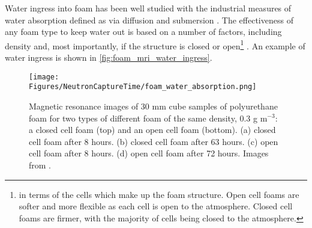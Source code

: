 

\par
Water ingress into foam has been well studied  with the industrial measures of water absorption defined as via diffusion and submersion \cite{foam_with_water_ref}.
The effectiveness of any foam type to keep water out is based on a number of factors, including density and, most importantly, if the structure is closed or open\footnote{in terms of the cells which make up the foam structure. Open cell foams are softer and more flexible as each cell is open to the atmosphere. Closed cell foams are firmer, with the majority of cells being closed to the atmosphere.} \cite{mechanical_properties_of_foam_ref}.
An example of water ingress is shown in \autoref{fig:foam_mri_water_ingress}.


\begin{figure}[]
\texttt{[image: Figures/NeutronCaptureTime/foam\_water\_absorption.png]}
\centering
\caption{Magnetic resonance images of 30 mm cube samples of polyurethane foam for two types of different foam of the same density, 0.3 g m${}^{-3}$: a closed cell foam (top) and an open cell foam (bottom).
(a) closed cell foam after 8 hours. (b) closed cell foam after 63 hours.
(c) open cell foam after 8 hours. (d) open cell foam after 72 hours.
Images from \cite{foam_mri_data_ref}.
}
\label{fig:foam_mri_water_ingress}
\end{figure}


